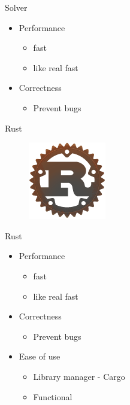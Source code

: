 \documentclass[mathserif,table]{gkibeamer-aaai}
\begin{document}
\begin{frame}{Solver}
	\begin{itemize}
		\item Performance
		      \begin{itemize}
			      \item fast
			      \item like real fast
		      \end{itemize}
		      \pause
		\item Correctness
		      \begin{itemize}
			      \item Prevent bugs
		      \end{itemize}
	\end{itemize}
\end{frame}

\begin{frame}{Rust}
	\begin{figure}[ht]
		\includegraphics[scale=0.6]{./figures/rust_logo.png}
	\end{figure}
\end{frame}

\begin{frame}{Rust}
	\begin{itemize}
		\item Performance
		      \begin{itemize}
			      \item fast
			      \item like real fast
		      \end{itemize}
		\item Correctness
		      \begin{itemize}
			      \item Prevent bugs
		      \end{itemize}
		      \pause
		\item Ease of use
		      \begin{itemize}
			      \pause
			      \item Library manager - Cargo
			            \pause
			      \item Functional
		      \end{itemize}
	\end{itemize}
\end{frame}
\end{document}
